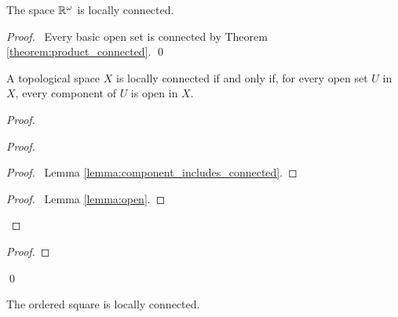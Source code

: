 \begin{proposition}
    The space $\mathbb{R}^\omega$ is locally connected.
\end{proposition}

\begin{proof}
    \pf\ Every basic open set is connected by Theorem \ref{theorem:product_connected}. \qed
\end{proof}

\begin{theorem}
    \label{theorem:open_component_locally_connected}
    A topological space $X$ is locally connected if and only if, for every
    open set $U$ in $X$, every component of $U$ is open in $X$.
\end{theorem}

\begin{proof}
    \pf
    \begin{proof}
        \begin{proof}
            \pf\ Lemma \ref{lemma:component_includes_connected}.
        \end{proof}
        \qedstep
        \begin{proof}
            \pf\ Lemma \ref{lemma:open}.
        \end{proof}
    \end{proof}
    \begin{proof}
    \end{proof}
    \qed
\end{proof}

\begin{example}
    The ordered square is locally connected.
\end{example}

